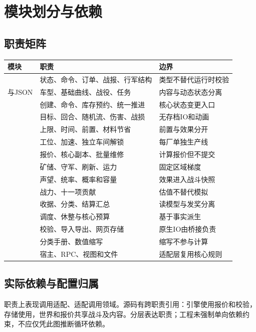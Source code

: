 \chapter{模块划分与依赖}
\section{职责矩阵}
\begin{small}\begin{longtable}{@{}P{43mm}P{54mm}P{47mm}@{}}
\toprule 模块 & 职责 & 边界\\\midrule\endhead
{} & 状态、命令、订单、战报、行军结构 & 类型不替代运行时校验\\
与JSON & 车型、基础曲线、战役、任务 & 内容与动态状态分离\\
 & 创建、命令、库存预约、统一推进 & 核心状态变更入口\\
 & 目标、回合、随机流、伤害、战损 & 无存档IO和动画\\
 & 上限、时间、前置、材料节省 & 前置与效果分开\\
 & 工位、加速、独立车间解锁 & 每厂单独生产线\\
 & 报价、核心副本、批量维修 & 计算报价但不提交\\
 & 矿储、守军、刷新、运力 & 固定区域梯度\\
 & 声望、统率、概率和容量 & 效果进入战斗快照\\
 & 战力、十一项贡献 & 估值不替代模拟\\
 & 收据、分类、结算汇总 & 读模型与发奖分离\\
 & 调度、休整与核心预算 & 基于事实派生\\
 & 校验、导入导出、网页存储 & 原生IO由桥接负责\\
 & 分类手册、数值缩写 & 缩写不参与计算\\
 & 宿主、RPC、视图和文件 & 适配层复用核心规则\\
\bottomrule\end{longtable}\end{small}

\section{实际依赖与配置归属}
职责上表现调用适配、适配调用领域。源码有跨职责引用：引擎使用报价和校验，存储使用，世界和报价共享战斗及内容。分层表达职责；工程未强制单向依赖约束，不应仅凭此图推断循环依赖。

